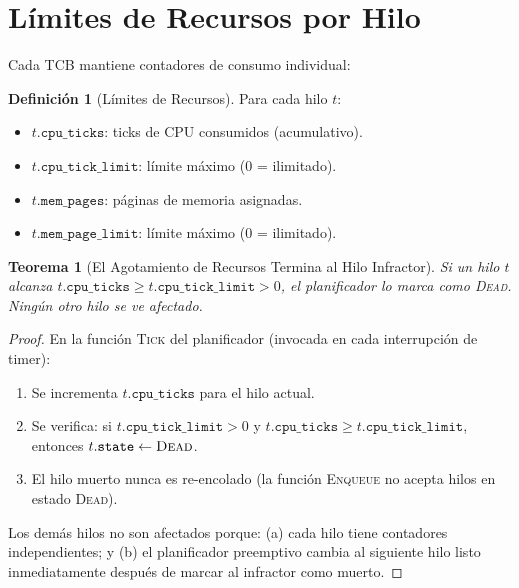 \documentclass[11pt,twoside,openright]{book}
\theoremstyle{definition}
\newtheorem{definition}{Definición}[chapter]
\theoremstyle{plain}
\newtheorem{theorem}{Teorema}[chapter]
\theoremstyle{remark}
\begin{document}
\section{Límites de Recursos por Hilo}

Cada TCB mantiene contadores de consumo individual:

\begin{definition}[Límites de Recursos]
\label{def:resource-limits}
Para cada hilo $t$:
\begin{itemize}
    \item $t.\texttt{cpu\_ticks}$: ticks de CPU consumidos (acumulativo).
    \item $t.\texttt{cpu\_tick\_limit}$: límite máximo (0 = ilimitado).
    \item $t.\texttt{mem\_pages}$: páginas de memoria asignadas.
    \item $t.\texttt{mem\_page\_limit}$: límite máximo (0 = ilimitado).
\end{itemize}
\end{definition}

\begin{theorem}[El Agotamiento de Recursos Termina al Hilo Infractor]
\label{thm:resource-exhaustion}
Si un hilo $t$ alcanza $t.\texttt{cpu\_ticks} \geq t.\texttt{cpu\_tick\_limit} > 0$,
el planificador lo marca como \textsc{Dead}. Ningún otro hilo se ve afectado.
\end{theorem}

\begin{proof}
En la función \textsc{Tick} del planificador (invocada en cada interrupción de timer):

\begin{enumerate}
    \item Se incrementa $t.\texttt{cpu\_ticks}$ para el hilo actual.
    \item Se verifica: si $t.\texttt{cpu\_tick\_limit} > 0$ y
          $t.\texttt{cpu\_ticks} \geq t.\texttt{cpu\_tick\_limit}$, entonces
          $t.\texttt{state} \gets \textsc{Dead}$.
    \item El hilo muerto nunca es re-encolado (la función \textsc{Enqueue} no acepta
          hilos en estado \textsc{Dead}).
\end{enumerate}

Los demás hilos no son afectados porque: (a) cada hilo tiene contadores independientes; y
(b) el planificador preemptivo cambia al siguiente hilo listo inmediatamente después de
marcar al infractor como muerto.
\end{proof}
\end{document}
